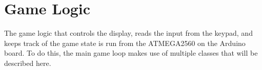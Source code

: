 \section{Game Logic}
The game logic that controls the display, reads the input from the keypad, and keeps track of the game state is run from the ATMEGA2560 on the Arduino board. To do this, the main game loop makes use of multiple classes that will be described here.






